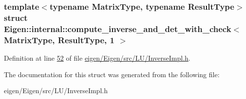 \subsubsection*{template$<$typename Matrix\+Type, typename Result\+Type$>$\newline
struct Eigen\+::internal\+::compute\+\_\+inverse\+\_\+and\+\_\+det\+\_\+with\+\_\+check$<$ Matrix\+Type, Result\+Type, 1 $>$}



Definition at line \hyperlink{eigen_2_eigen_2src_2_l_u_2_inverse_impl_8h_source_l00052}{52} of file \hyperlink{eigen_2_eigen_2src_2_l_u_2_inverse_impl_8h_source}{eigen/\+Eigen/src/\+L\+U/\+Inverse\+Impl.\+h}.



The documentation for this struct was generated from the following file\+:\begin{DoxyCompactItemize}
\item 
eigen/\+Eigen/src/\+L\+U/\+Inverse\+Impl.\+h\end{DoxyCompactItemize}
